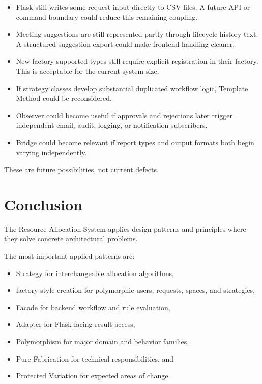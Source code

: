 \documentclass[12pt,a4paper]{article}
\begin{document}
\begin{itemize}
    \item Flask still writes some request input directly to CSV files.
    A future API or command boundary could reduce this remaining coupling.

    \item Meeting suggestions are still represented partly through lifecycle
    history text. A structured suggestion export could make frontend handling
    cleaner.

    \item New factory-supported types still require explicit registration in
    their factory. This is acceptable for the current system size.

    \item If strategy classes develop substantial duplicated workflow logic,
    Template Method could be reconsidered.

    \item Observer could become useful if approvals and rejections later trigger
    independent email, audit, logging, or notification subscribers.

    \item Bridge could become relevant if report types and output formats both
    begin varying independently.
\end{itemize}

These are future possibilities, not current defects.

\section{Conclusion}

The Resource Allocation System applies design patterns and principles where
they solve concrete architectural problems.

The most important applied patterns are:

\begin{itemize}
    \item Strategy for interchangeable allocation algorithms,
    \item factory-style creation for polymorphic users, requests, spaces, and
    strategies,
    \item Facade for backend workflow and rule evaluation,
    \item Adapter for Flask-facing result access,
    \item Polymorphism for major domain and behavior families,
    \item Pure Fabrication for technical responsibilities, and
    \item Protected Variation for expected areas of change.
\end{itemize}
\end{document}
